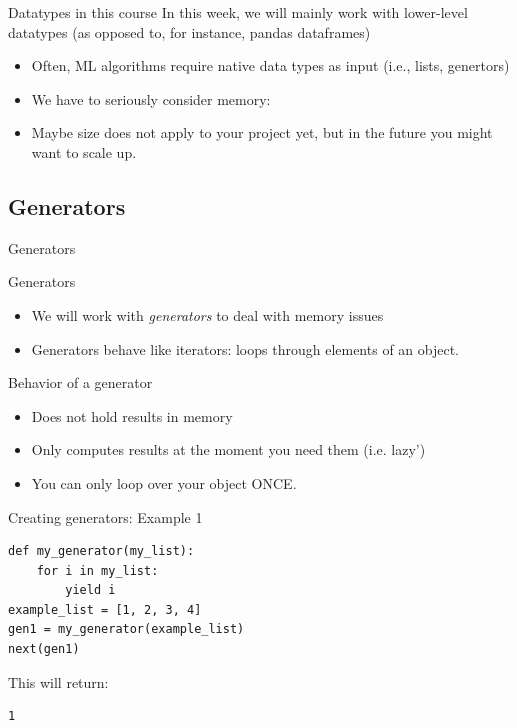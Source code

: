\documentclass[handout]{beamer}
\begin{document}
\begin{frame}{Datatypes in this course}
In this week, we will mainly work with lower-level datatypes (as opposed to, for instance, pandas dataframes)
\begin{itemize}[<+->]
	\item Often, ML algorithms require native data types as input (i.e., lists, genertors)
	\item We have to seriously consider memory:
	\item Maybe size does not apply to your project yet, but in the future you might want to scale up. 
\end{itemize}	
\end{frame}

\subsection{Generators}
\begin{frame}{Generators}
\begin{block}{Generators}
	\begin{itemize}[<+->]
		\item We will work with \textit{generators} to deal with memory issues
		\item Generators behave like iterators: loops through elements of an object. 
	\end{itemize}
\end{block}
\pause
\begin{exampleblock}{Behavior of a generator}
	\begin{itemize}[<+->]
		\item Does not hold results in memory
		\item Only computes results at the moment you need them (i.e. lazy')
		\item You can only loop over your object ONCE.
	\end{itemize}
\end{exampleblock}
\end{frame}

\begin{frame}
Creating generators: Example 1 
\begin{lstlisting}
def my_generator(my_list):	
    for i in my_list:
        yield i
example_list = [1, 2, 3, 4]
gen1 = my_generator(example_list)        
next(gen1)
\end{lstlisting}
This will return:
\begin{lstlisting}
1
\end{lstlisting}
\end{frame}
\end{document}
